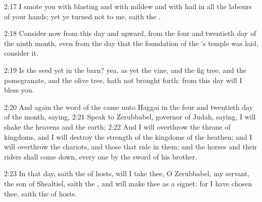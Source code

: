 2:17 I smote you with blasting and with mildew and with hail in all
the labours of your hands; yet ye turned not to me, saith the \LORD.

2:18 Consider now from this day and upward, from the four and
twentieth day of the ninth month, even from the day that the
foundation of the \LORD's temple was laid, consider it.

2:19 Is the seed yet in the barn? yea, as yet the vine, and the fig
tree, and the pomegranate, and the olive tree, hath not brought forth:
from this day will I bless you.

2:20 And again the word of the \LORD came unto Haggai in the four and
twentieth day of the month, saying, 2:21 Speak to Zerubbabel, governor
of Judah, saying, I will shake the heavens and the earth; 2:22 And I
will overthrow the throne of kingdoms, and I will destroy the strength
of the kingdoms of the heathen; and I will overthrow the chariots, and
those that ride in them; and the horses and their riders shall come
down, every one by the sword of his brother.

2:23 In that day, saith the \LORD of hosts, will I take thee, O
Zerubbabel, my servant, the son of Shealtiel, saith the \LORD, and will
make thee as a signet: for I have chosen thee, saith the \LORD of hosts.

